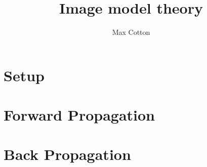 \documentclass[10pt,a4paper]{article}
\title{Image model theory}
\author{Max Cotton}
\date{}
\begin{document}
\maketitle

\section{Setup}

\section{Forward Propagation}

\section{Back Propagation}
\end{document}
